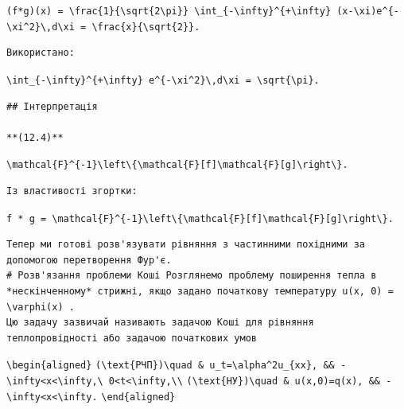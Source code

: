 \documentclass[
  ukrainian,
]{article}
\begin{document}
\texttt{(f*g)(x)\ =\ \textbackslash{}frac\{1\}\{\textbackslash{}sqrt\{2\textbackslash{}pi\}\}\ \textbackslash{}int\_\{-\textbackslash{}infty\}\^{}\{+\textbackslash{}infty\}\ (x-\textbackslash{}xi)e\^{}\{-\textbackslash{}xi\^{}2\}\textbackslash{},d\textbackslash{}xi\ =\ \textbackslash{}frac\{x\}\{\textbackslash{}sqrt\{2\}\}.}

\begin{verbatim}
Використано:
\end{verbatim}

\texttt{\textbackslash{}int\_\{-\textbackslash{}infty\}\^{}\{+\textbackslash{}infty\}\ e\^{}\{-\textbackslash{}xi\^{}2\}\textbackslash{},d\textbackslash{}xi\ =\ \textbackslash{}sqrt\{\textbackslash{}pi\}.}

\begin{verbatim}
## Інтерпретація

**(12.4)**
\end{verbatim}

\texttt{\textbackslash{}mathcal\{F\}\^{}\{-1\}\textbackslash{}left\textbackslash{}\{\textbackslash{}mathcal\{F\}{[}f{]}\textbackslash{}mathcal\{F\}{[}g{]}\textbackslash{}right\textbackslash{}\}.}

\begin{verbatim}
Із властивості згортки:
\end{verbatim}

\texttt{f\ *\ g\ =\ \textbackslash{}mathcal\{F\}\^{}\{-1\}\textbackslash{}left\textbackslash{}\{\textbackslash{}mathcal\{F\}{[}f{]}\textbackslash{}mathcal\{F\}{[}g{]}\textbackslash{}right\textbackslash{}\}.}

\begin{verbatim}
Тепер ми готові розв'язувати рівняння з частинними похідними за допомогою перетворення Фур'є.
# Розв'язання проблеми Коші Розглянемо проблему поширення тепла в *нескінченному* стрижні, якщо задано початкову температуру u(x, 0) = \varphi(x) .
Цю задачу зазвичай називають задачою Коші для рівняння теплопровідності або задачою початкових умов
\end{verbatim}

\texttt{\textbackslash{}begin\{aligned\}}
\texttt{(\textbackslash{}text\{РЧП\})\textbackslash{}quad\ \&\ u\_t=\textbackslash{}alpha\^{}2u\_\{xx\},\ \&\&\ -\textbackslash{}infty\textless{}x\textless{}\textbackslash{}infty,\textbackslash{}\ 0\textless{}t\textless{}\textbackslash{}infty,\textbackslash{}\textbackslash{}}
\texttt{(\textbackslash{}text\{НУ\})\textbackslash{}quad\ \&\ u(x,0)=q(x),\ \&\&\ -\textbackslash{}infty\textless{}x\textless{}\textbackslash{}infty.}
\texttt{\textbackslash{}end\{aligned\}}
\end{document}
